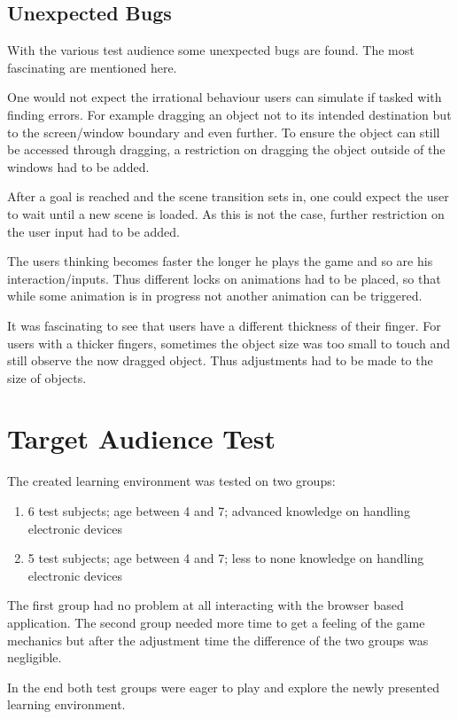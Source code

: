 \subsection{Unexpected Bugs}\label{subsec:unexpected-bugs}
With the various test audience some unexpected bugs are found. The most fascinating are mentioned here.

One would not expect the irrational behaviour users can simulate if tasked with finding errors.
For example dragging an object not to its intended destination but to the screen/window boundary and even further.
To ensure the object can still be accessed through dragging,
a restriction on dragging the object outside of the windows had to be added.

After a goal is reached and the scene transition sets in, one could expect the user to wait until a new scene is loaded.
As this is not the case, further restriction on the user input had to be added.

The users thinking becomes faster the longer he plays the game and so are his interaction/inputs.
Thus different locks on animations had to be placed, so that while some animation is in progress not another animation can
be triggered.

It was fascinating to see that users have a different thickness of their finger.
For users with a thicker fingers, sometimes the object size was too small to touch and still observe the now dragged object.
Thus adjustments had to be made to the size of objects.

\section{Target Audience Test}\label{sec:target-audience-test}
The created learning environment was tested on two groups:
\begin{enumerate}
    \item 6 test subjects; age between 4 and 7; advanced knowledge on handling electronic devices
    \item 5 test subjects; age between 4 and 7; less to none knowledge on handling electronic devices
\end{enumerate}

The first group had no problem at all interacting with the browser based application.
The second group needed more time to get a feeling of the game mechanics but after the adjustment time the difference of
the two groups was negligible.

In the end both test groups were eager to play and explore the newly presented learning environment.


